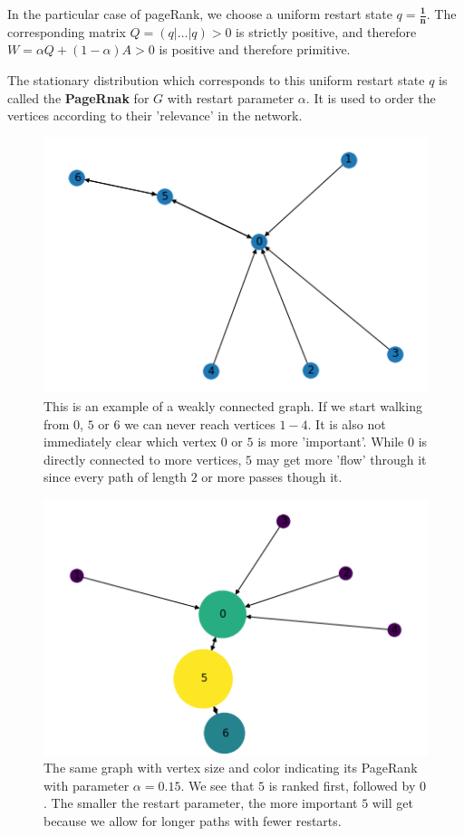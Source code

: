 \documentclass[a4paper,10pt]{article}
\newcommand{\gt}{>}
\theoremstyle{definition}
\theoremstyle{remark}
\theoremstyle{plain}
\begin{document}
In the particular case of pageRank, we choose a uniform restart
state $q = \mathbf{\frac{1}{n}}$. The corresponding matrix $Q =
(q|\dots|q) \gt 0$ is strictly positive, and therefore 
$W = \alpha Q + (1 - \alpha)A > 0$ is positive and therefore
primitive.

The stationary distribution which corresponds to this uniform
restart state $q$ is called the \textbf{PageRnak} for $G$ with
restart parameter $\alpha$. It is used to order the vertices
according to their 'relevance' in the network.


\begin{figure}[!htb]
\begin{framed}
  \centering
    \includegraphics[width=0.55\linewidth]{directed_graph_example_unranked.png}
  \caption{This is an example of a weakly connected graph. If we start walking
  from $0$, $5$ or $6$ we can never reach vertices $1-4$. It is also not immediately
  clear which vertex $0$ or $5$ is more 'important'. While $0$ is directly
  connected to more vertices, $5$ may get more 'flow' through it since every
  path of length $2$ or more passes though it.}
  \label{fig:weaklyconnected}
\end{framed}
\end{figure}

\begin{figure}[!htb]
\begin{framed}
  \centering
    \includegraphics[width=0.55\linewidth]{directed_graph_example.png}
  \caption{The same graph with vertex size and color indicating its PageRank
  with parameter $\alpha=0.15$. We see that $5$ is ranked first, followed by
  $0$. The smaller the restart parameter, the more important $5$ will get
  because we allow for longer paths with fewer restarts.}
  \label{fig:weaklyconnectedpagedranked}
\end{framed}
\end{figure}
\end{document}
